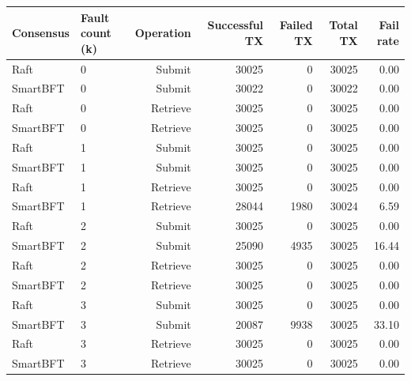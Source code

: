 \begin{tabular}{llrrrrr}
\hline
Consensus & Fault count (k) & Operation & Successful TX & Failed TX & Total TX & Fail rate \\
\hline
Raft & 0 & Submit & 30025 & 0 & 30025 & 0.00 \\
SmartBFT & 0 & Submit & 30022 & 0 & 30022 & 0.00 \\
Raft & 0 & Retrieve & 30025 & 0 & 30025 & 0.00 \\
SmartBFT & 0 & Retrieve & 30025 & 0 & 30025 & 0.00 \\
Raft & 1 & Submit & 30025 & 0 & 30025 & 0.00 \\
SmartBFT & 1 & Submit & 30025 & 0 & 30025 & 0.00 \\
Raft & 1 & Retrieve & 30025 & 0 & 30025 & 0.00 \\
SmartBFT & 1 & Retrieve & 28044 & 1980 & 30024 & 6.59 \\
Raft & 2 & Submit & 30025 & 0 & 30025 & 0.00 \\
SmartBFT & 2 & Submit & 25090 & 4935 & 30025 & 16.44 \\
Raft & 2 & Retrieve & 30025 & 0 & 30025 & 0.00 \\
SmartBFT & 2 & Retrieve & 30025 & 0 & 30025 & 0.00 \\
Raft & 3 & Submit & 30025 & 0 & 30025 & 0.00 \\
SmartBFT & 3 & Submit & 20087 & 9938 & 30025 & 33.10 \\
Raft & 3 & Retrieve & 30025 & 0 & 30025 & 0.00 \\
SmartBFT & 3 & Retrieve & 30025 & 0 & 30025 & 0.00 \\
\hline
\end{tabular}